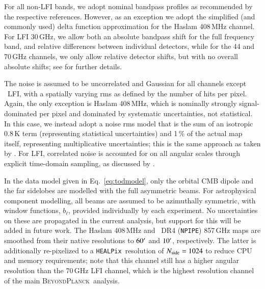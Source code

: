 \documentclass[twocolumn]{aa}
\def\healpix{\texttt{HEALPix}}
\newcommand{\BP}{\textsc{BeyondPlanck}}
\newcommand{\npipe}[0]{\texttt{NPIPE}}
\begin{document}
For all non-LFI bands, we adopt nominal bandpass profiles as
recommended by the respective references. However, as an exception we
adopt the simplified (and commonly used) delta function approximation
for the Haslam 408\,MHz channel. For LFI 30\,GHz, we allow both an
absolute bandpass shift for the full frequency band, and relative
differences between individual detectors, while for the 44 and 70\,GHz
channels, we only allow relative detector shifts, but with no overall
absolute shifts; see \citet{bp09} for further details.

The noise is assumed to be uncorrelated and Gaussian for all channels
except \Planck\ LFI, with a spatially varying rms as defined by the
number of hits per pixel. Again, the only exception is Haslam
408\,MHz, which is nominally strongly signal-dominated per pixel and dominated
by systematic uncertainties, not statistical. In this case, we instead
adopt a noise rms model that is the sum of an isotropic 0.8\,K term
(representing statistical uncertainties) and 1\,\% of the actual map
itself, representing multiplicative uncertainties; this is the same
approach as taken by \citet{planck2014-a12}. For LFI, correlated noise
is accounted for on all angular scales through explicit time-domain
sampling, as discussed by \citet{bp06}.

In the data model given in Eq.~\eqref{eq:todmodel}, only the orbital CMB
dipole and the far sidelobes are modelled with the full asymmetric beams. 
For astrophysical component modelling,
all beams are assumed to be azimuthally symmetric, with window
functions, $b_{\ell}$, provided individually by each experiment. No
uncertainties on these are propagated in the current analysis, but
support for this will be added in future work. The Haslam 408\,MHz and
\Planck\ DR4 (\npipe) 857\,GHz maps are smoothed from their native
resolutions to $60\arcm$ and $10\arcm$, respectively. The latter is
additionally re-pixelized to a \healpix\ resolution of $\nside = 1024$
to reduce CPU and memory requirements; note that this channel still
has a higher angular resolution than the 70\,GHz LFI channel, which is
the highest resolution channel of the main \BP\ analysis. 
\end{document}

